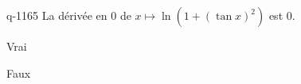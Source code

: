 \begin{truefalse}{q-1165}
La dérivée en $0$ de $x\mapsto \ln(1+(\tan x)^2)$ est $0$.
\item* Vrai
\item Faux
\end{truefalse}

